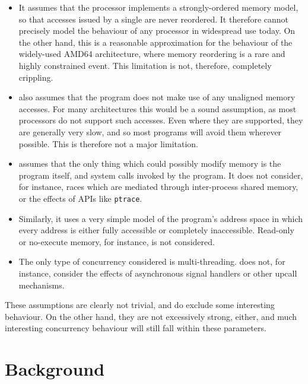 \begin{itemize}
\item It assumes that the processor implements a strongly-ordered
  memory model, so that accesses issued by a single are never
  reordered.  It therefore cannot precisely model the behaviour of any
  processor in widespread use today.  On the other hand, this is a
  reasonable approximation for the behaviour of the widely-used AMD64
  architecture\needCite{}, where memory reordering is a rare and
  highly constrained event.  This limitation is not, therefore,
  completely crippling.

\item {\Technique} also assumes that the program does not make use of
  any unaligned memory accesses.  For many architectures this would be
  a sound assumption, as most processors do not support such accesses.
  Even where they are supported, they are generally very slow, and so
  most programs will avoid them wherever possible.  This is therefore
  not a major limitation.

\item {\Technique} assumes that the only thing which could possibly
  modify memory is the program itself, and system calls invoked by the
  program.  It does not consider, for instance, races which are
  mediated through inter-process shared memory, or the effects of APIs
  like \texttt{ptrace}.

\item Similarly, it uses a very simple model of the program's address
  space in which every address is either fully accessible or
  completely inaccessible.  Read-only or no-execute memory\needCite{},
  for instance, is not considered.

\item The only type of concurrency considered is multi-threading.
  {\Technique} does not, for instance, consider the effects of
  asynchronous signal handlers or other upcall mechanisms.
\end{itemize}

These assumptions are clearly not trivial, and do exclude some
interesting behaviour.  On the other hand, they are not excessively
strong, either, and much interesting concurrency behaviour will still
fall within these parameters.

\section{Background}


